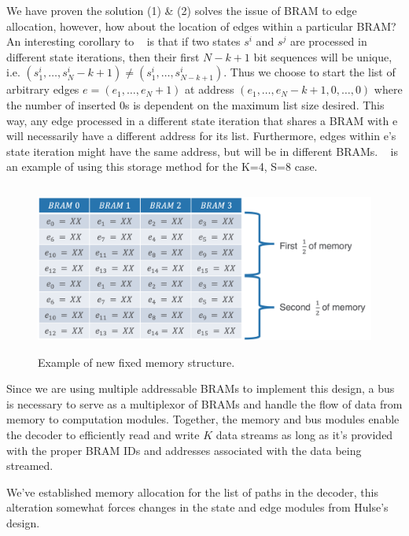 We have proven the solution (1) \& (2) solves the issue of BRAM to edge allocation, however, how about the location of edges within a particular BRAM? An interesting corollary to \Lemma~ is that if two states $s^i$ and $s^j$ are processed in different state iterations, then their first $N-k+1$ bit sequences will be unique, i.e. $(s^i_1, \ldots, s^i_N-k+1) \neq (s^i_1, \ldots, s^i_{N-k+1})$. Thus we choose to start the list of arbitrary edges $e = (e_1, \ldots, e_N+1)$ at address $(e_1, \ldots, e_N-k+1, 0, \ldots, 0)$ where the number of inserted 0s is dependent on the maximum list size desired. This way, any edge processed in a different state iteration that shares a BRAM with e will necessarily have a different address for its list. Furthermore, edges within e’s state iteration might have the same address, but will be in different BRAMs. \Figure~ is an example of using this storage method for the K=4, S=8 case.

\begin{figure}
\centering\CaptionFontSize
\includegraphics[height=15em]
{Figures/new_fixed_mem.png}
\caption[Example of new fixed memory structure]
{Example of new fixed memory structure.}
\label{Figure:DecoderHW:NewMemory}
\end{figure}

Since we are using multiple addressable BRAMs to implement this design, a bus is necessary to serve as a multiplexor of BRAMs and handle the flow of data from memory to computation modules. Together, the memory and bus modules enable the decoder to efficiently read and write $K$ data streams as long as it’s provided with the proper BRAM IDs and addresses associated with the data being streamed.

We’ve established memory allocation for the list of paths in the decoder, this alteration somewhat forces changes in the state and edge modules from Hulse’s design.

